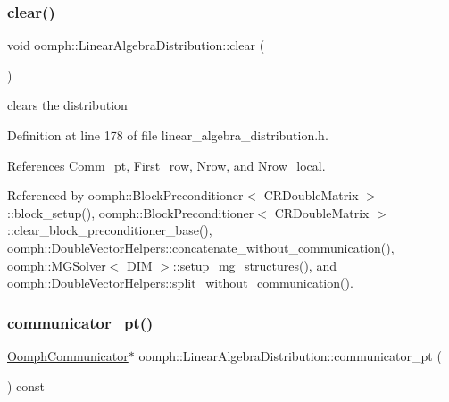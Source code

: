 \subsubsection{\texorpdfstring{clear()}{clear()}}
{\footnotesize\ttfamily void oomph\+::\+Linear\+Algebra\+Distribution\+::clear (\begin{DoxyParamCaption}{ }\end{DoxyParamCaption})\hspace{0.3cm}{\ttfamily [inline]}}



clears the distribution 



Definition at line 178 of file linear\+\_\+algebra\+\_\+distribution.\+h.



References Comm\+\_\+pt, First\+\_\+row, Nrow, and Nrow\+\_\+local.



Referenced by oomph\+::\+Block\+Preconditioner$<$ C\+R\+Double\+Matrix $>$\+::block\+\_\+setup(), oomph\+::\+Block\+Preconditioner$<$ C\+R\+Double\+Matrix $>$\+::clear\+\_\+block\+\_\+preconditioner\+\_\+base(), oomph\+::\+Double\+Vector\+Helpers\+::concatenate\+\_\+without\+\_\+communication(), oomph\+::\+M\+G\+Solver$<$ D\+I\+M $>$\+::setup\+\_\+mg\+\_\+structures(), and oomph\+::\+Double\+Vector\+Helpers\+::split\+\_\+without\+\_\+communication().

\mbox{\label{classoomph_1_1LinearAlgebraDistribution_a2e4736826a65253f574d4f6f152ab514}} 
\subsubsection{\texorpdfstring{communicator\+\_\+pt()}{communicator\_pt()}}
{\footnotesize\ttfamily \hyperlink{classoomph_1_1OomphCommunicator}{Oomph\+Communicator}$\ast$ oomph\+::\+Linear\+Algebra\+Distribution\+::communicator\+\_\+pt (\begin{DoxyParamCaption}{ }\end{DoxyParamCaption}) const\hspace{0.3cm}{\ttfamily [inline]}}



